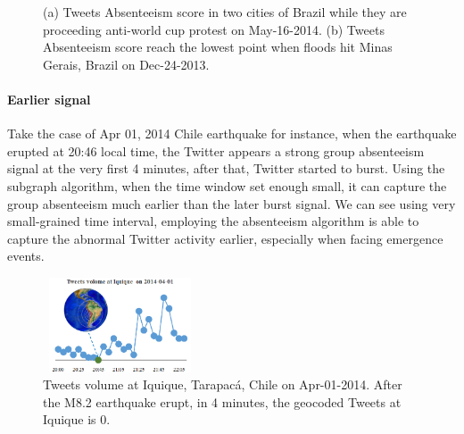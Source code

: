 \begin{figure}[h]
	\centering
	\vspace{-1em}
	\caption{ (a) Tweets Absenteeism score in two cities of Brazil while they are proceeding anti-world cup protest on May-16-2014. (b) Tweets Absenteeism score reach the lowest point when floods hit Minas Gerais, Brazil on Dec-24-2013.}
	\label{fig:flood_cup}
\end{figure}

\paragraph{Earlier signal}
Take the case of Apr 01, 2014 Chile earthquake for instance, when the earthquake erupted at 20:46 local time, the Twitter appears a strong group absenteeism signal at the very first 4 minutes, after that, Twitter started to burst. Using the subgraph algorithm, when the time window set enough small, it can capture the group absenteeism much earlier than the later burst signal. We can see using very small-grained time interval, employing the absenteeism algorithm is able to capture the abnormal Twitter activity earlier, especially when facing emergence events.
\begin{figure}[h]
	\centering
	\includegraphics[width=1.8in, height=1.1in]{figures/earthquake_example.png}
	\caption{Tweets volume at Iquique, Tarapacá, Chile on Apr-01-2014. After the M8.2 earthquake erupt, in 4 minutes, the geocoded Tweets at Iquique is 0.
	}
	\label{fig:earthquake}
\end{figure}


